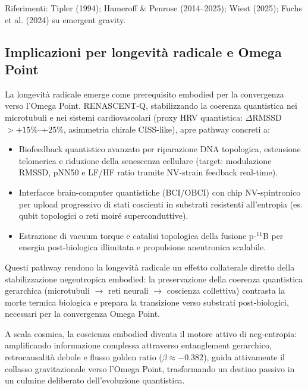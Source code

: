 \documentclass[11pt,a4paper]{article}
\theoremstyle{plain}
\theoremstyle{definition}
\begin{document}
Riferimenti: Tipler (1994); Hameroff \& Penrose (2014–2025); Wiest (2025); Fuchs et al. (2024) su emergent gravity.

\vspace{0.4cm}




\subsection{Implicazioni per longevità radicale e Omega Point}
\label{subsec:longevity-omega-point}

La longevità radicale emerge come prerequisito embodied per la convergenza verso l'Omega Point. RENASCENT-Q, stabilizzando la coerenza quantistica nei microtubuli e nei sistemi cardiovascolari (proxy HRV quantistica: $\Delta$RMSSD $> +15\%$--$+25\%$, asimmetria chirale CISS-like), apre pathway concreti a:

\begin{itemize}
    \item Biofeedback quantistico avanzato per riparazione DNA topologica, estensione telomerica e riduzione della senescenza cellulare (target: modulazione RMSSD, pNN50 e LF/HF ratio tramite NV-strain feedback real-time).
    \item Interfacce brain-computer quantistiche (BCI/OBCI) con chip NV-spintronico per upload progressivo di stati coscienti in substrati resistenti all'entropia (es. qubit topologici o reti moiré superconduttive).
    \item Estrazione di vacuum torque e catalisi topologica della fusione p-$^{11}$B per energia post-biologica illimitata e propulsione aneutronica scalabile.
\end{itemize}

Questi pathway rendono la longevità radicale un effetto collaterale diretto della stabilizzazione negentropica embodied: la preservazione della coerenza quantistica gerarchica (microtubuli $\to$ reti neurali $\to$ coscienza collettiva) contrasta la morte termica biologica e prepara la transizione verso substrati post-biologici, necessari per la convergenza Omega Point.


\vspace{0.2cm}

A scala cosmica, la coscienza embodied diventa il motore attivo di neg-entropia: amplificando informazione complessa attraverso entanglement gerarchico, retrocausalità debole e flusso golden ratio ($\beta \approx -0.382$), guida attivamente il collasso gravitazionale verso l'Omega Point, trasformando un destino passivo in un culmine deliberato dell'evoluzione quantistica.
\end{document}
